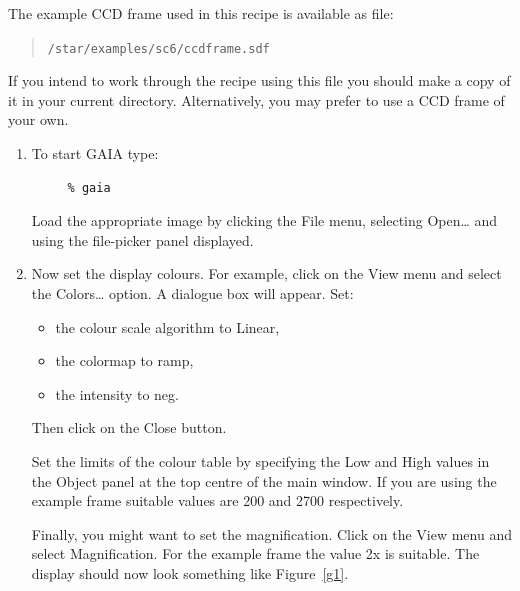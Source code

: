 \documentclass[twoside,11pt]{article}
\begin{document}
The example CCD frame used in this recipe is available as file:

\begin{verse}
{\tt /star/examples/sc6/ccdframe.sdf}
\end{verse}

If you intend to work through the recipe using this file you should make
a copy of it in your current directory.  Alternatively, you may prefer
to use a CCD frame of your own.

\begin{enumerate}

  \item To start GAIA type:

\begin{verbatim}
     % gaia
\end{verbatim}

   Load the appropriate image by clicking the {\sf File} menu,
   selecting {\sf Open\ldots} and using the file-picker panel displayed.

  \item Now set the display colours.  For example, click on the {\sf
   View} menu and select the {\sf Colors\ldots} option.  A dialogue box
   will appear.  Set:

  \begin{itemize}

    \item the colour scale algorithm to {\sf Linear},

    \item the colormap to {\sf ramp},

    \item the intensity to {\sf neg}.

  \end{itemize}

   Then click on the {\sf Close} button.

   Set the limits of the colour table by specifying the {\sf Low} and
   {\sf High} values in the {\sf Object} panel at the top centre of the
   main window.  If you are using the example frame suitable values are
   200 and 2700 respectively.

   Finally, you might want to set the magnification.  Click on the {\sf
   View} menu and select {\sf Magnification}.  For the example frame
   the value {\sf 2x} is suitable.  The display should now look something
   like Figure~\ref{g1}.


\end{enumerate}
\end{document}

